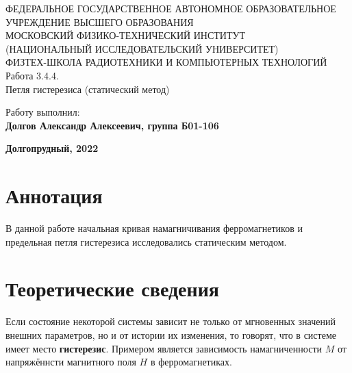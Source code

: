 \documentclass[14pt, a4paper,reqno]{article}
\begin{document}
\begin{center}
  {\small ФЕДЕРАЛЬНОЕ ГОСУДАРСТВЕННОЕ АВТОНОМНОЕ ОБРАЗОВАТЕЛЬНОЕ\\ УЧРЕЖДЕНИЕ ВЫСШЕГО ОБРАЗОВАНИЯ\\ МОСКОВСКИЙ ФИЗИКО-ТЕХНИЧЕСКИЙ ИНСТИТУТ\\ (НАЦИОНАЛЬНЫЙ ИССЛЕДОВАТЕЛЬСКИЙ УНИВЕРСИТЕТ)\\ ФИЗТЕХ-ШКОЛА РАДИОТЕХНИКИ И КОМПЬЮТЕРНЫХ ТЕХНОЛОГИЙ}\\
  \hfill \break
  \hfill \break
  \hfill \break
  \Huge{Работа 3.4.4. \\ Петля гистерезиса (статический метод)}\\
\end{center}

\hfill \break
\hfill \break
\hfill \break
\hfill \break
\hfill \break
\hfill \break
\hfill \break
\hfill \break

\begin{flushright}
  \normalsize{Работу выполнил:}\\
  \normalsize{\textbf{Долгов Александр Алексеевич, группа Б01-106}}\\
\end{flushright}

\vspace*{\fill} %

\begin{center}
  \normalsize{\textbf{Долгопрудный, 2022}}
\end{center}

\thispagestyle{empty} %


\newpage
\thispagestyle{plain}
\tableofcontents
\thispagestyle{plain}
\newpage
\section{Аннотация}

    В данной работе начальная кривая намагничивания ферромагнетиков и предельная петля гистерезиса исследовались
    статическим методом.

\section{Теоретические сведения}

    Если состояние некоторой системы зависит не только от мгновенных значений внешних параметров, 
    но и от истории их изменения, то говорят, что в системе имеет место \textbf{гистерезис}. Примером
    является зависимость намагниченности $M$ от напряжённсти магнитного поля $H$ в ферромагнетиках.
    
\end{document}
